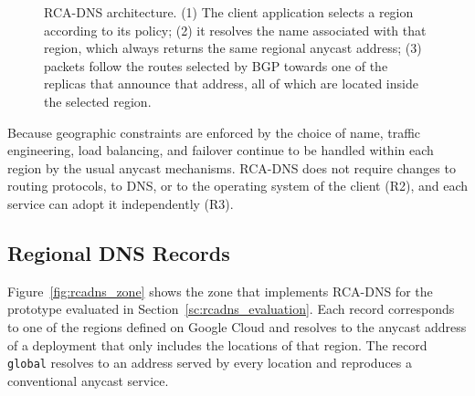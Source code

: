 \documentclass[
A4paper,                %
twoside,                %
openright,              %
chapterprefix=true,     %
12pt,                   %
headings=normal,        %
titlepage=on            %
]{book}
\begin{document}
\begin{figure}[ht]
{
}
    \caption{RCA-DNS architecture. (1) The client application selects a region according to its policy; (2) it resolves the name associated with that region, which always returns the same regional anycast address; (3) packets follow the routes selected by BGP towards one of the replicas that announce that address, all of which are located inside the selected region.}
    \label{fig:rcadns_architecture}
\end{figure}

Because geographic constraints are enforced by the choice of name, traffic engineering, load balancing, and failover continue to be handled within each region by the usual anycast mechanisms. RCA-DNS does not require changes to routing protocols, to DNS, or to the operating system of the client (R2), and each service can adopt it independently (R3).

\subsection{Regional DNS Records}
\label{sc:rcadns_records}

Figure~\ref{fig:rcadns_zone} shows the zone that implements RCA-DNS for the prototype evaluated in Section~\ref{sc:rcadns_evaluation}. Each record corresponds to one of the regions defined on Google Cloud and resolves to the anycast address of a deployment that only includes the locations of that region. The record \texttt{global} resolves to an address served by every location and reproduces a conventional anycast service.
\end{document}
